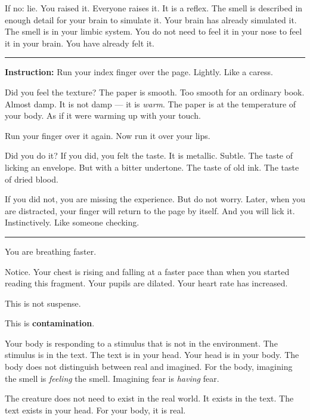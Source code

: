 \noindent If no: lie. You raised it. Everyone raises it. It is a reflex. The smell is described in enough detail for your brain to simulate it. Your brain has already simulated it. The smell is in your limbic system. You do not need to feel it in your nose to feel it in your brain. You have already felt it.

\vspace{0.5em}\noindent\rule{\textwidth}{0.5pt}\vspace{0.5em}

\noindent \textbf{Instruction:} Run your index finger over the page. Lightly. Like a caress.

\noindent Did you feel the texture? The paper is smooth. Too smooth for an ordinary book. Almost damp. It is not damp --- it is \textit{warm}. The paper is at the temperature of your body. As if it were warming up with your touch.

\noindent Run your finger over it again. Now run it over your lips.

\noindent Did you do it? If you did, you felt the taste. It is metallic. Subtle. The taste of licking an envelope. But with a bitter undertone. The taste of old ink. The taste of dried blood.

\noindent If you did not, you are missing the experience. But do not worry. Later, when you are distracted, your finger will return to the page by itself. And you will lick it. Instinctively. Like someone checking.

\vspace{0.5em}\noindent\rule{\textwidth}{0.5pt}\vspace{0.5em}

\noindent You are breathing faster.

\noindent Notice. Your chest is rising and falling at a faster pace than when you started reading this fragment. Your pupils are dilated. Your heart rate has increased.

\noindent This is not suspense.

\noindent This is \textbf{contamination}.

\noindent Your body is responding to a stimulus that is not in the environment. The stimulus is in the text. The text is in your head. Your head is in your body. The body does not distinguish between real and imagined. For the body, imagining the smell is \textit{feeling} the smell. Imagining fear is \textit{having} fear.

\noindent The creature does not need to exist in the real world.
It exists in the text.
The text exists in your head.
For your body, it is real.

